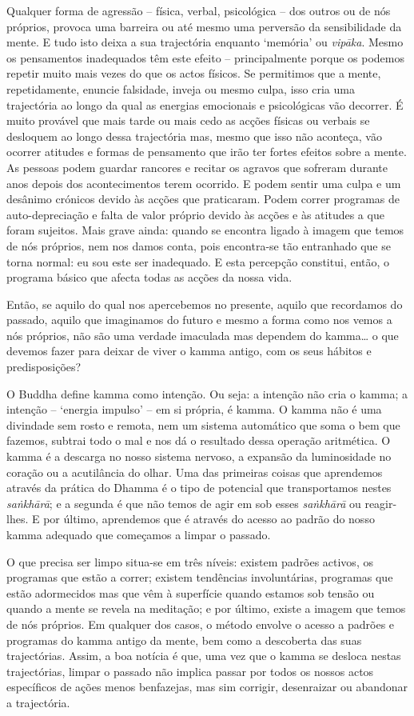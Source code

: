 Qualquer forma de agressão -- física, verbal, psicológica -- dos outros ou de
nós próprios, provoca uma barreira ou até mesmo uma perversão da sensibilidade
da mente. E tudo isto deixa a sua trajectória enquanto `memória' ou
\emph{vipāka}. Mesmo os pensamentos inadequados têm este efeito --
principalmente porque os podemos repetir muito mais vezes do que os actos
físicos. Se permitimos que a mente, repetidamente, enuncie falsidade, inveja ou
mesmo culpa, isso cria uma trajectória ao longo da qual as energias emocionais e
psicológicas vão decorrer. É muito provável que mais tarde ou mais cedo as
acções físicas ou verbais se desloquem ao longo dessa trajectória mas, mesmo que
isso não aconteça, vão ocorrer atitudes e formas de pensamento que irão ter
fortes efeitos sobre a mente. As pessoas podem guardar rancores e recitar os
agravos que sofreram durante anos depois dos acontecimentos terem ocorrido. E
podem sentir uma culpa e um desânimo crónicos devido às acções que praticaram.
Podem correr programas de auto-depreciação e falta de valor próprio devido às
acções e às atitudes a que foram sujeitos. Mais grave ainda: quando se encontra
ligado à imagem que temos de nós próprios, nem nos damos conta, pois encontra-se
tão entranhado que se torna normal: eu sou este ser inadequado. E esta percepção
constitui, então, o programa básico que afecta todas as acções da nossa vida.

Então, se aquilo do qual nos apercebemos no presente, aquilo que recordamos do
passado, aquilo que imaginamos do futuro e mesmo a forma como nos vemos a nós
próprios, não são uma verdade imaculada mas dependem do kamma\ldots{} o que devemos
fazer para deixar de viver o kamma antigo, com os seus hábitos e predisposições?

O Buddha define kamma como intenção. Ou seja: a intenção não cria o kamma; a
intenção -- `energia impulso' -- em si própria, é kamma. O kamma não é uma
divindade sem rosto e remota, nem um sistema automático que soma o bem que
fazemos, subtrai todo o mal e nos dá o resultado dessa operação aritmética. O
kamma é a descarga no nosso sistema nervoso, a expansão da luminosidade no
coração ou a acutilância do olhar. Uma das primeiras coisas que aprendemos
através da prática do Dhamma é o tipo de potencial que transportamos nestes
\emph{saṅkhārā}; e a segunda é que não temos de agir em sob esses
\emph{saṅkhārā} ou reagir-lhes. E por último, aprendemos que é através do acesso
ao padrão do nosso kamma adequado que começamos a limpar o passado.

O que precisa ser limpo situa-se em três níveis: existem padrões activos, os
programas que estão a correr; existem tendências involuntárias, programas que
estão adormecidos mas que vêm à superfície quando estamos sob tensão ou quando a
mente se revela na meditação; e por último, existe a imagem que temos de nós
próprios. Em qualquer dos casos, o método envolve o acesso a padrões e programas
do kamma antigo da mente, bem como a descoberta das suas trajectórias. Assim, a
boa notícia é que, uma vez que o kamma se desloca nestas trajectórias, limpar o
passado não implica passar por todos os nossos actos específicos de ações menos
benfazejas, mas sim corrigir, desenraizar ou abandonar a trajectória.

